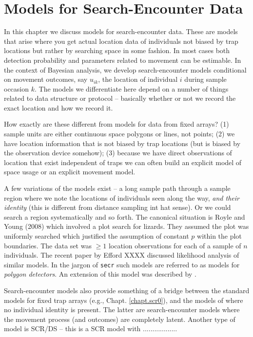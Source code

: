 \chapter{Models for  Search-Encounter Data}
\label{chapt.search-encounter}

\vspace{0.3cm}


In this chapter we discuss models for 
search-encounter data. These are models that arise where you get
actual location data of individuals not biased by trap locations but
rather by searching space in some fashion. In most cases both
detection probability and parameters related to movement can be
estimable. In the context of Bayesian analysis, we develop
search-encounter models conditional on 
movement outcomes, say $u_{ik}$, the location of individual $i$ during
sample occasion $k$.
The models we differentiate here depend on a number of
things related to data structure or protocol -- basically whether or
not we record the exact location and how we record it. 


How exactly
are these different from models for data from fixed arrays?  (1)
sample units are either continuous space polygons or lines, not
points; (2) we have location information that is not biased by trap
locations (but is biased by the observation device somehow); (3)
because we have direct observations of location that exist independent
of traps we can often build an explicit model of space usage or an
explicit movement model.

A few variations of the models exist -- a long sample path through a
sample region where we note the locations of individuals seen along
the way, {\it and their identity} (this is different from distance
sampling int hat sense). Or we could search a region systematically
and so forth.  
The canonical situation is Royle and Young (2008) which involved a
plot search for lizards. They assumed the plot was uniformly searched
which justified the assumption of constant $p$ within the plot
boundaries. The data set was $\ge 1$ location observations for each of
a sample of $n$ individuals. 
The recent paper by Efford XXXX
discussed likelihood analysis of similar models. In the jargon of
\mbox{\tt secr} such models are referred to as models for {\it polygon detectors}.
 An extension of this model was described
by \citep{royle_etal:2011mee}.  

Search-encounter models also provide something of a bridge between the
standard models for fixed trap arrays (e.g., Chapt. \ref{chapt.scr0}),
and the models of \citep{chandler_royle:2012} where no individual
identity is present. The latter are search-encounter models where the
movement process (and outcomes) are completely latent. Another type of
model is SCR/DS -- this is a SCR model with ..................

